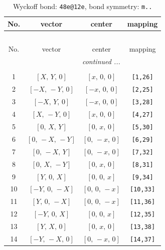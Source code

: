 \documentclass[fleqn,8pt]{jsarticle}
\begin{document}
\begin{longtable}{cccc}
\caption{Wyckoff bond: {\tt 48e@12e}, bond symmetry: {\tt m..}}
 \\
 \hline \hline
No. & vector & center & mapping \\ \hline \endfirsthead

\multicolumn{3}{l}{\tablename\ \thetable{}} \\
 \hline \hline
No. & vector & center & mapping \\ \hline \endhead

 \hline \hline
\multicolumn{3}{r}{\footnotesize\it continued ...} \\ \endfoot

 \hline \hline
\multicolumn{3}{r}{} \\ \endlastfoot

1 & $\left[ X,\, Y,\, 0 \right]$ & $\left[ x,\, 0,\, 0 \right]$ & {\tt [1,26]} \\ \hline
2 & $\left[ - X,\, - Y,\, 0 \right]$ & $\left[ - x,\, 0,\, 0 \right]$ & {\tt [2,25]} \\ \hline
3 & $\left[ - X,\, Y,\, 0 \right]$ & $\left[ - x,\, 0,\, 0 \right]$ & {\tt [3,28]} \\ \hline
4 & $\left[ X,\, - Y,\, 0 \right]$ & $\left[ x,\, 0,\, 0 \right]$ & {\tt [4,27]} \\ \hline
5 & $\left[ 0,\, X,\, Y \right]$ & $\left[ 0,\, x,\, 0 \right]$ & {\tt [5,30]} \\ \hline
6 & $\left[ 0,\, - X,\, - Y \right]$ & $\left[ 0,\, - x,\, 0 \right]$ & {\tt [6,29]} \\ \hline
7 & $\left[ 0,\, - X,\, Y \right]$ & $\left[ 0,\, - x,\, 0 \right]$ & {\tt [7,32]} \\ \hline
8 & $\left[ 0,\, X,\, - Y \right]$ & $\left[ 0,\, x,\, 0 \right]$ & {\tt [8,31]} \\ \hline
9 & $\left[ Y,\, 0,\, X \right]$ & $\left[ 0,\, 0,\, x \right]$ & {\tt [9,34]} \\ \hline
10 & $\left[ - Y,\, 0,\, - X \right]$ & $\left[ 0,\, 0,\, - x \right]$ & {\tt [10,33]} \\ \hline
11 & $\left[ Y,\, 0,\, - X \right]$ & $\left[ 0,\, 0,\, - x \right]$ & {\tt [11,36]} \\ \hline
12 & $\left[ - Y,\, 0,\, X \right]$ & $\left[ 0,\, 0,\, x \right]$ & {\tt [12,35]} \\ \hline
13 & $\left[ Y,\, X,\, 0 \right]$ & $\left[ 0,\, x,\, 0 \right]$ & {\tt [13,38]} \\ \hline
14 & $\left[ - Y,\, - X,\, 0 \right]$ & $\left[ 0,\, - x,\, 0 \right]$ & {\tt [14,37]} \\ \hline

\end{longtable}
\end{document}
